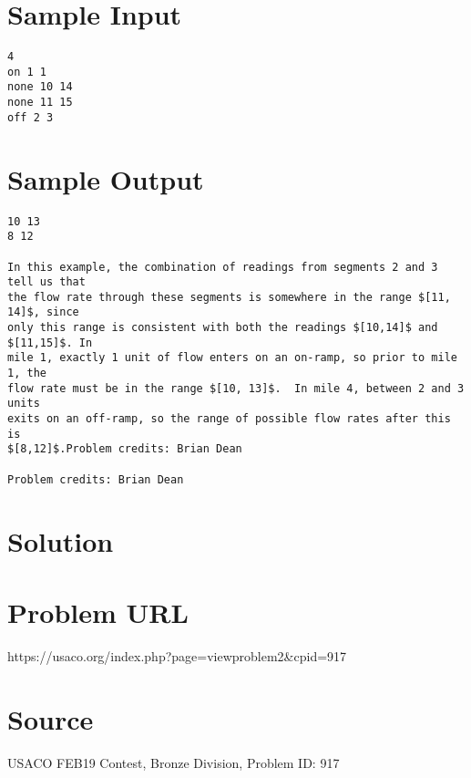 \documentclass[12pt]{article}
\begin{document}
\section*{Sample Input}
\begin{verbatim}
4
on 1 1
none 10 14
none 11 15
off 2 3
\end{verbatim}

\section*{Sample Output}
\begin{verbatim}
10 13
8 12

In this example, the combination of readings from segments 2 and 3 tell us that
the flow rate through these segments is somewhere in the range $[11, 14]$, since
only this range is consistent with both the readings $[10,14]$ and $[11,15]$. In
mile 1, exactly 1 unit of flow enters on an on-ramp, so prior to mile 1, the
flow rate must be in the range $[10, 13]$.  In mile 4, between 2 and 3 units
exits on an off-ramp, so the range of possible flow rates after this is
$[8,12]$.Problem credits: Brian Dean

Problem credits: Brian Dean
\end{verbatim}

\section*{Solution}


\section*{Problem URL}
https://usaco.org/index.php?page=viewproblem2&cpid=917

\section*{Source}
USACO FEB19 Contest, Bronze Division, Problem ID: 917
\end{document}
